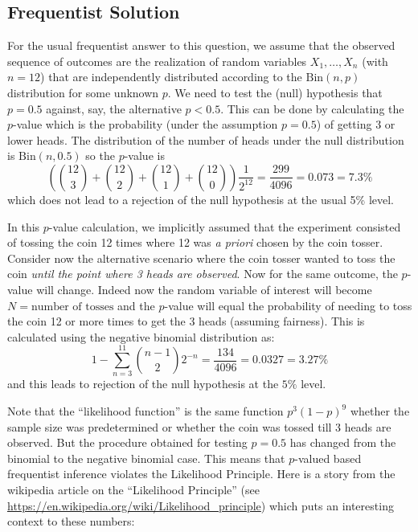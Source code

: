 \documentclass{scrartcl}
\begin{document}
\subsection{Frequentist Solution}

For the usual frequentist answer to this question, we assume that the
observed sequence of outcomes are the realization of random variables
$X_1, \dots, X_n$ (with $n = 12$) that are independently distributed
according to the $\text{Bin}(n, p)$ distribution for some unknown
$p$. We need to test the (null) hypothesis that $p = 0.5$ against,
say, the alternative $p < 0.5$. This can be 
done by calculating the $p$-value which is the probability (under the
assumption $p = 0.5$) of getting 3 or lower heads. The distribution of
the number of heads under the null distribution is $\text{Bin}(n,
0.5)$ so the $p$-value is
\begin{equation*}
 \left( \binom{12}{3} + \binom{12}{2} + \binom{12}{1}  + \binom{12}{0}
 \right) \frac{1}{2^{12}} = \frac{299}{4096} = 0.073 = 7.3\%
\end{equation*}
which does not lead to a rejection of the null hypothesis at the usual
5\% level.

In this $p$-value calculation, we
  implicitly assumed that the experiment 
consisted of tossing the coin 12 times where 12 was \textit{a priori}
chosen by the coin tosser. Consider now the alternative scenario where
the coin tosser wanted to toss the coin \textit{until the point where
  3 heads are 
observed}. Now for the same outcome, the $p$-value will change. Indeed 
now the random variable of interest will become $N = \text{number of tosses}$ and
the $p$-value will equal the probability of needing to toss the coin
12 or more times to get the 3 heads (assuming fairness). This is
calculated using the negative binomial distribution as: 
\begin{equation*}
 1 - \sum_{n = 3}^{11} \binom{n-1}{2} 2^{-n}  = \frac{134}{4096} =
 0.0327 = 3.27\%
\end{equation*}
and this leads to rejection of the null hypothesis at the $5\%$
level.


Note that the ``likelihood function'' is the same function $p^3(1 -
p)^9$ whether the sample size was predetermined or whether the coin
was tossed till 3 heads are observed. But the procedure obtained for
testing $p = 0.5$ has changed from the binomial to the negative
binomial case. This means that $p$-valued based frequentist inference
violates the Likelihood Principle. Here is a story from the
wikipedia article on the ``Likelihood Principle''  (see
\url{https://en.wikipedia.org/wiki/Likelihood_principle}) which puts
an interesting context to these numbers: 
\end{document}
